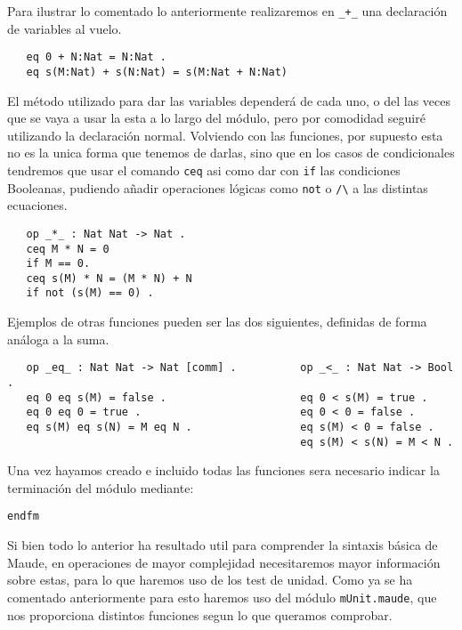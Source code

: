 Para ilustrar lo comentado lo anteriormente realizaremos en \verb"_+_" una declaración de variables al vuelo. \par
{\codesize
\begin{verbatim}
   eq 0 + N:Nat = N:Nat .
   eq s(M:Nat) + s(N:Nat) = s(M:Nat + N:Nat) 
\end{verbatim}
}
 
El método utilizado para dar las variables dependerá de cada uno, o del las veces que se vaya a usar la esta a lo largo del módulo, pero por comodidad seguiré utilizando la declaración normal. Volviendo con las funciones, por supuesto esta no es la unica forma que tenemos de darlas, sino que en los casos de condicionales tendremos que usar el comando \texttt{ceq} asi como dar con \texttt{if} las condiciones Booleanas, pudiendo añadir operaciones lógicas como \texttt{not} o \verb"/\" a las distintas ecuaciones.\par
{\codesize
\begin{verbatim}
   op _*_ : Nat Nat -> Nat .
   ceq M * N = 0 
   if M == 0.
   ceq s(M) * N = (M * N) + N
   if not (s(M) == 0) .
\end{verbatim}
}

Ejemplos de otras funciones pueden ser las dos siguientes, definidas de forma análoga a la suma.\par

{\codesize
\begin{verbatim}
   op _eq_ : Nat Nat -> Nat [comm] .          op _<_ : Nat Nat -> Bool .
   eq 0 eq s(M) = false .                     eq 0 < s(M) = true .
   eq 0 eq 0 = true .                         eq 0 < 0 = false .
   eq s(M) eq s(N) = M eq N .                 eq s(M) < 0 = false .
                                              eq s(M) < s(N) = M < N .	

\end{verbatim}
}

Una vez hayamos creado e incluido todas las funciones sera necesario indicar la terminación del módulo mediante: \par

{\codesize
\begin{verbatim}
endfm
\end{verbatim}
}

Si bien todo lo anterior ha resultado util para comprender la sintaxis básica de Maude, en operaciones de mayor complejidad necesitaremos mayor información sobre estas, para lo que haremos uso de los test de unidad. Como ya se ha comentado anteriormente para esto haremos uso del módulo \texttt{mUnit.maude}, que nos proporciona distintos funciones segun lo que queramos comprobar.\par

